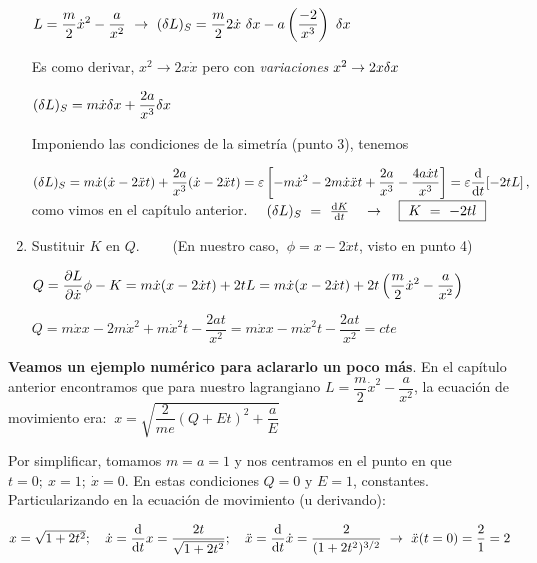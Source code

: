 \begin{enumerate}
\vspace{2mm}$\displaystyle L=\dfrac m 2 \dot x^2 -\dfrac{a}{x^2} \ \to \ (\var L)_S=\dfrac m 2 2 \dot x \ \var x - a \left(\dfrac{-2}{x^3} \right) \ \var  x$

\vspace{2mm}\textcolor{gris}{Es como derivar, $x^2 \to 2x \dot x$ pero con \emph{variaciones} $x^2 \to 2x\var x$}

\vspace{2mm}$\displaystyle (\var L)_S=m\dot x \var x + \dfrac{2a}{x^3} \var x$

\vspace{2mm} Imponiendo las condiciones de la simetría (punto 3), tenemos

\vspace{2mm} $\displaystyle (\var L)_S=m\dot x (\dot x -2\ddot x t) + \dfrac{2a}{x^3} (\dot x -2\ddot x t)=\varepsilon \left[ -m\dot x^2-2m\dot x \ddot x t+\dfrac{2a}{x^3}-\dfrac{4a \dot x t}{x^3} \right] = \varepsilon \dv{t} [-2tL]\, , \ $ como vimos en el capítulo anterior.
$\quad (\var L)_S \ = \ \dv{K}{t} \quad \to \quad \boxed{ \ K \ = \ -2tl\ }$

\vspace{2mm}
\item Sustituir $K$ en $Q.\qquad$ \textcolor{gris}{(En nuestro caso, $\ \phi=x-2\dot x t$, visto en punto 4)}

\vspace{2mm} $Q=\displaystyle \pdv{L}{\dot x} \phi - K=m\dot x(x-2\dot xt)+2tL=m\dot x(x-2\dot xt)+2t\left( \dfrac m 2 \dot x^2 -\dfrac{a}{x^2} \right)$

\vspace{2mm}$\displaystyle Q=m\dot x x -2m\dot x^2+m\dot x^2t-\dfrac{2at}{x^2} = m\dot x x -m\dot x^2 t-\dfrac{2at}{x^2}=cte$

\end{enumerate}

\textbf{Veamos un ejemplo numérico para aclararlo un poco más}. En el capítulo anterior encontramos que para nuestro lagrangiano $L=\dfrac m 2 \dot x^2 -\dfrac{a}{x^2}$, la ecuación de movimiento era: $\ x=\sqrt{\dfrac{2}{me}(Q+Et)^2+\dfrac a E}$

Por simplificar, tomamos $m=a=1$ y nos centramos en el punto en que $t=0;\ x=1;\ \dot x=0$. En estas condiciones $Q=0 \text{ y } E=1$, constantes. Particularizando en la ecuación de movimiento (u derivando):

$x=\sqrt{1+2t^2};\quad \dot x=\displaystyle \dv{t} x = \dfrac{2t}{\sqrt{1+2t^2}};\quad \ddot x=\dv{t} \dot x=\dfrac{2}{(1+2t^2)^{3/2}} \ \to \ \ddot x(t=0)=\dfrac 2 1 =2$

